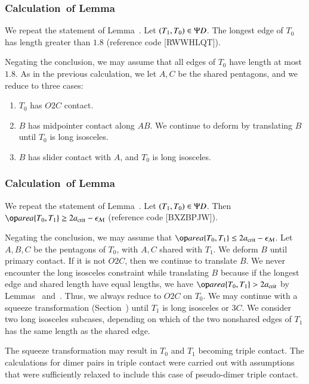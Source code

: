\subsubsection{Calculation~of Lemma~} 

We repeat the statement of Lemma~.
Let $(T_1,T_0)\in \Psi D$.  The longest edge of $T_0$
has length greater than $1.8$ (reference code [RWWHLQT]).


Negating the conclusion, we may assume that all edges of $T_0$ have
length at most $1.8$.  As in the previous calculation, we let $A,C$ be
the shared pentagons, and we reduce to three cases:
\begin{enumerate}
\item $T_0$ has $O2C$ contact.
\item $B$ has midpointer contact along $AB$.  We continue to deform by
  translating $B$ until $T_0$ is long isosceles.
\item $B$ has slider contact with $A$, and $T_0$ is long isosceles.
\end{enumerate}

\subsubsection{Calculation~of Lemma~} 

We repeat the statement of Lemma~.
Let $(T_1,T_0)\in\Psi D$.  Then $\area\{T_0,T_1\} \ge 2\acrit - \epsM$
(reference code [BXZBPJW]).

Negating the conclusion, we may assume that $\area\{T_0,T_1\}\le
2\acrit - \epsM$.  Let $A,B,C$ be the pentagons of $T_0$, with $A,C$
shared with $T_1$.  We deform $B$ until primary contact.  If it is not
$O2C$, then we continue to translate $B$.  We never encounter the long
isosceles constraint while translating $B$ because if the longest edge
and shared length have equal lengths, we have $\area\{T_0,T_1\} >
2\acrit$ by Lemmas~ and~.  Thus,
we always reduce to $O2C$ on $T_0$.  We may continue with a squeeze
transformation (Section~) until $T_1$ is long
isosceles or $3C$.  We consider two long isosceles subcases, depending
on which of the two nonshared edges of $T_1$ has the same length as the
shared edge.

The squeeze transformation may result in $T_0$ and $T_1$ becoming
triple contact.  The calculations for dimer pairs in triple contact
were carried out with assumptions that were sufficiently relaxed to
include this case of pseudo-dimer triple contact.

